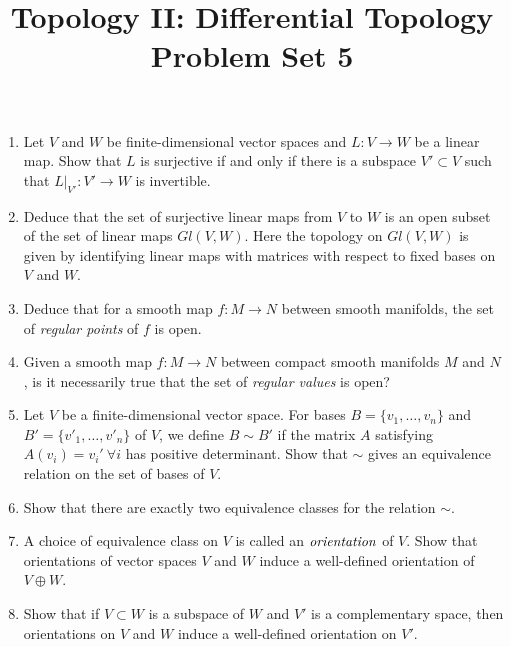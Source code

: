\documentclass[12pt]{article}
\begin{document}
\title{Topology II: Differential Topology\\
Problem Set 5} 
\date{}
\maketitle

\thispagestyle{empty}

\begin{enumerate}

\item Let $V$ and $W$ be finite-dimensional vector spaces and $L:V\to W$ be a linear map. Show that $L$ is surjective if and only if there is a subspace $V'\subset V$ such that $L\vert_{V'}:V'\to W$ is invertible.

\item Deduce that the set of surjective linear maps from $V$ to $W$ is an open subset of the set of linear maps $Gl(V,W)$. Here the topology on $Gl(V,W)$ is given by identifying linear maps with matrices with respect to fixed bases on $V$ and $W$.

\item Deduce that for a smooth map $f:M\to N$ between smooth manifolds, the set of \textit{regular points} of $f$ is  open.

\item Given a smooth map $f:M\to N$ between compact smooth manifolds $M$ and $N$, is it necessarily true that the set of \emph{regular values} is open?

\item Let $V$ be a finite-dimensional vector space. For bases $B=\{v_1,\dots,v_n\}$ and $B'=\{v'_1,\dots, v'_n\}$ of $V$, we define $B\sim B'$ if the matrix $A$ satisfying $A(v_i)=v_i'\ \forall i$ has positive determinant. Show that $\sim$ gives an equivalence relation on the set of bases of $V$.

\item Show that there are exactly two equivalence classes for the relation $\sim$.

\item A choice of equivalence class on $V$ is called an $\emph{orientation}$ of $V$. Show that orientations of vector spaces $V$ and $W$ induce a well-defined orientation of $V\oplus W$.

\item Show that if $V\subset W$ is a subspace of $W$ and $V'$ is a complementary space, then orientations on $V$ and $W$ induce a well-defined orientation on $V'$.

\end{enumerate}
\end{document}
